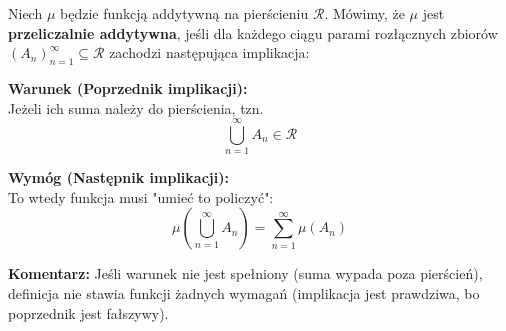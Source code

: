 \begin{remark}
    Niech $\mu$ będzie funkcją addytywną na pierścieniu $\mathcal{R}$. Mówimy, że $\mu$ jest \textbf{przeliczalnie addytywna}, jeśli dla każdego ciągu parami rozłącznych zbiorów $(A_n)_{n=1}^\infty \subseteq \mathcal{R}$ zachodzi następująca implikacja:
    
        \textbf{Warunek (Poprzednik implikacji):} \\
        Jeżeli ich suma należy do pierścienia, tzn.
        \[ \bigcup_{n=1}^{\infty} A_n \in \mathcal{R} \]
        
        \textbf{Wymóg (Następnik implikacji):} \\
        To wtedy funkcja musi "umieć to policzyć":
        \[ \mu \left( \bigcup_{n=1}^{\infty} A_n \right) = \sum_{n=1}^{\infty} \mu(A_n) \]
    
    \noindent\textbf{Komentarz:} Jeśli warunek nie jest spełniony (suma wypada poza pierścień), definicja nie stawia funkcji żadnych wymagań (implikacja jest prawdziwa, bo poprzednik jest fałszywy).
\end{remark}

